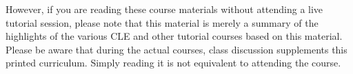 \documentclass[10pt, letterpaper]{book}
\begin{document}
However, if you are reading these course materials without attending a live
tutorial session, please note that this material is merely a summary of the
highlights of the various CLE and other tutorial courses based on this
material.  Please be aware that during the actual courses, class discussion
supplements this printed curriculum.  Simply reading it is not equivalent to
attending the course.

\mainmatter



%

%
\end{document}
